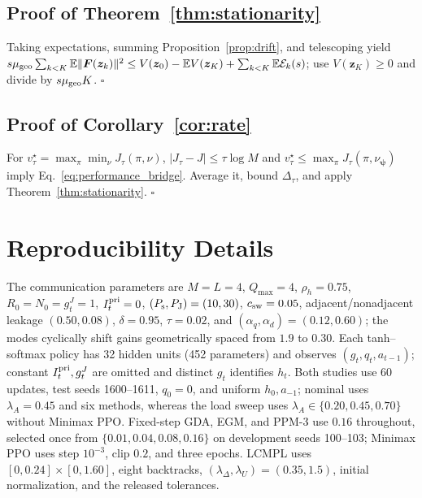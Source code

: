 \documentclass[conference]{IEEEtran}
\newcommand{\bF}{\bm{F}}
\newcommand{\bz}{\bm{z}}
\newcommand{\bpsi}{\bm{\psi}}
\newcommand{\E}{\mathbb{E}}
\begin{document}
\subsection{Proof of Theorem~\ref{thm:stationarity}}
\label{app:proof-theorem}
Taking expectations, summing Proposition~\ref{prop:drift}, and telescoping yield $s\mu_{\rm geo}\sum_{k<K}\E\|\bF(\bz_k)\|^2\leq V(\bz_0)-\E V(\bz_K)+\sum_{k<K}\E\mathcal E_k(s)$; use $V(\bz_K)\geq0$ and divide by $s\mu_{\rm geo}K$.
\hfill$\square$

\subsection{Proof of Corollary~\ref{cor:rate}}
\label{app:proof-corollary}
For $v_\tau^\star=\max_{\pi}\min_{\nu}J_\tau(\pi,\nu)$, $|J_\tau-J|\leq\tau\log M$ and $v_\tau^\star\leq\max_\pi J_\tau(\pi,\nu_{\bpsi})$ imply Eq.~\eqref{eq:performance_bridge}. Average it, bound $\Delta_\tau$, and apply Theorem~\ref{thm:stationarity}.
\hfill$\square$

\section{Reproducibility Details}
\label{app:reproducibility}
The communication parameters are $M=L=4$, $Q_{\max}=4$, $\rho_h=0.75$, $R_0=N_0=g_t^J=1$, $I_t^{\rm pri}=0$, $(P_{\rm s},P_{\rm J})=(10,30)$, $c_{\rm sw}=0.05$, adjacent/nonadjacent leakage $(0.50,0.08)$, $\delta=0.95$, $\tau=0.02$, and $(\alpha_q,\alpha_d)=(0.12,0.60)$; the modes cyclically shift gains geometrically spaced from $1.9$ to $0.30$.
Each tanh--softmax policy has 32 hidden units (452 parameters) and observes $(g_t,q_t,a_{t-1})$; constant $I_t^{\rm pri},g_t^J$ are omitted and distinct $g_t$ identifies $h_t$.
Both studies use 60 updates, test seeds 1600--1611, $q_0=0$, and uniform $h_0,a_{-1}$; nominal uses $\lambda_A=0.45$ and six methods, whereas the load sweep uses $\lambda_A\in\{0.20,0.45,0.70\}$ without Minimax PPO.
Fixed-step GDA, EGM, and PPM-3 use $0.16$ throughout, selected once from $\{0.01,0.04,0.08,0.16\}$ on development seeds 100--103; Minimax PPO uses step $10^{-3}$, clip $0.2$, and three epochs.
LCMPL uses $[0,0.24]\times[0,1.60]$, eight backtracks, $(\lambda_\Delta,\lambda_U)=(0.35,1.5)$, initial normalization, and the released tolerances.



\end{document}

